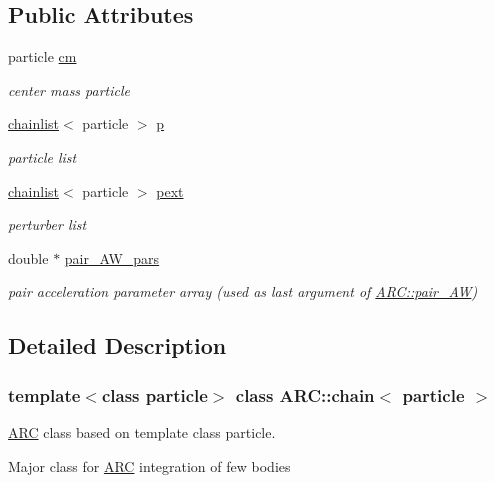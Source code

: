 \subsection*{Public Attributes}
\begin{DoxyCompactItemize}
\item 
particle \hyperlink{classARC_1_1chain_ae9f6a5cbf7aac2b33c7274e7e10916ed}{cm}
\begin{DoxyCompactList}\small\item\em center mass particle \end{DoxyCompactList}\item 
\hyperlink{classARC_1_1chainlist}{chainlist}$<$ particle $>$ \hyperlink{classARC_1_1chain_af1793b656e139e1f87c2e0a55f87514b}{p}
\begin{DoxyCompactList}\small\item\em particle list \end{DoxyCompactList}\item 
\hyperlink{classARC_1_1chainlist}{chainlist}$<$ particle $>$ \hyperlink{classARC_1_1chain_a6e4f41c7d3f8d44a4a01734ff4ab20cf}{pext}
\begin{DoxyCompactList}\small\item\em perturber list \end{DoxyCompactList}\item 
double $\ast$ \hyperlink{classARC_1_1chain_a8c5f29c3d307bb216fdc68641b412c72}{pair\+\_\+\+A\+W\+\_\+pars}
\begin{DoxyCompactList}\small\item\em pair acceleration parameter array (used as last argument of \hyperlink{namespaceARC_a5c4308ca4a8d0e0ff59fdce30f00274c}{A\+R\+C\+::pair\+\_\+\+AW}) \end{DoxyCompactList}\end{DoxyCompactItemize}


\subsection{Detailed Description}
\subsubsection*{template$<$class particle$>$\newline
class A\+R\+C\+::chain$<$ particle $>$}

\hyperlink{namespaceARC}{A\+RC} class based on template class particle. 

Major class for \hyperlink{namespaceARC}{A\+RC} integration of few bodies

